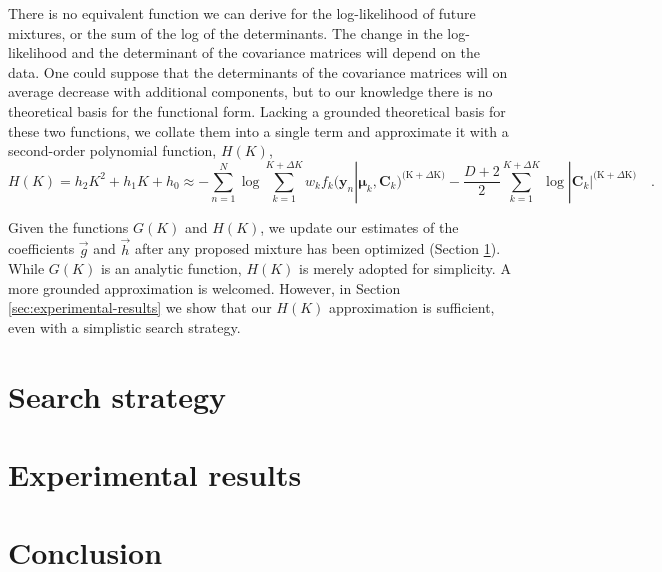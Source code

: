 \documentclass{article}
\newcommand{\vect}[1]{\boldsymbol{\mathbf{#1}}}
\def\veccov{\vect{C}}
\def\vecmean{\vect{\mu}}
\def\weight{w}
\def\datum{y}
\def\data{\vect{\datum}}
\def\future{^{\mathrm{(K} + \Delta\mathrm{K)}}}
\begin{document}
There is no equivalent function we can derive for the log-likelihood of future
mixtures, or the sum of the log of the determinants.  
The change in the log-likelihood and the determinant of the covariance
matrices will depend on the data.
One could suppose that the determinants of the covariance matrices will on
average decrease with additional components, but to our knowledge there is 
no theoretical basis for the functional form.
Lacking a grounded theoretical basis for these two functions, we collate them
into a single term and approximate it with a second-order polynomial function,
$H(K)$,
\begin{equation}
H(K) = h_2K^2 + h_1K + h_0 \approx -\sum_{n=1}^{N}\log\sum_{k=1}^{K+\Delta{K}}\weight_{k}f_{k}(\data_n|\vecmean_k,\veccov_k)\future - \frac{D+2}{2}\sum_{k=1}^{K + \Delta{K}}\log|\veccov_k|\future \quad .
\end{equation}


Given the functions $G(K)$ and $H(K)$, we update our estimates of the 
coefficients $\vec{g}$ and $\vec{h}$ after any proposed mixture has been
optimized (Section \ref{sec:search-strategy}).  While $G(K)$ is an analytic
function, $H(K)$ is merely adopted for simplicity.  A more grounded
approximation is welcomed.  However, in Section \ref{sec:experimental-results}
we show that our $H(K)$ approximation is sufficient, even with a simplistic
search strategy.



\section{Search strategy}
\label{sec:search-strategy}




\section{Experimental results}

% 


\section{Conclusion}


\end{document}
